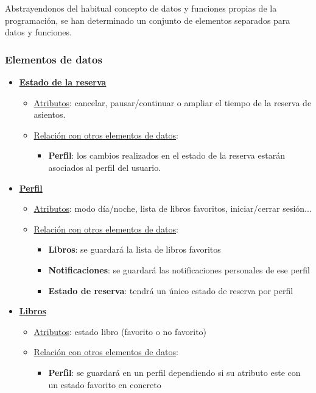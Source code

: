 \documentclass[12pt]{article}
\begin{document}
    Abstrayendonos del habitual concepto de datos y funciones propias de la programación, se han determinado un conjunto de elementos separados para datos y funciones.

\subsubsection{Elementos de datos}
\begin{itemize}

\item \textbf{\underline{Estado de la reserva}}
\begin{itemize}
\item \underline{Atributos}: cancelar, pausar/continuar o ampliar el tiempo de la reserva de 
       asientos.
\item \underline{Relación con otros elementos de datos}:
\begin{itemize}
\item \textbf{Perfil}: los cambios realizados en el estado de la reserva estarán asociados al perfil del usuario.
\end{itemize}
\end{itemize}
\item \textbf{\underline{Perfil}}
\begin{itemize}
\item \underline{Atributos}: modo día/noche, lista de libros favoritos, iniciar/cerrar sesión...
\item \underline{Relación con otros elementos de datos}: 
\begin{itemize}
\item \textbf{Libros}: se guardará la lista de libros favoritos
\item \textbf{Notificaciones}: se guardará las notificaciones personales de ese perfil
\item \textbf{Estado de reserva}: tendrá un único estado de reserva por perfil
\end{itemize}
\end{itemize}
\item \textbf{\underline{Libros}}
\begin{itemize}
\item \underline{Atributos}: estado libro (favorito o no favorito)
\item \underline{Relación con otros elementos de datos}:
\begin{itemize}
\item \textbf{Perfil}: se guardará en un perfil dependiendo si su atributo este con un estado favorito en concreto

\end{itemize}
\end{itemize}
\end{itemize}
\end{document}

